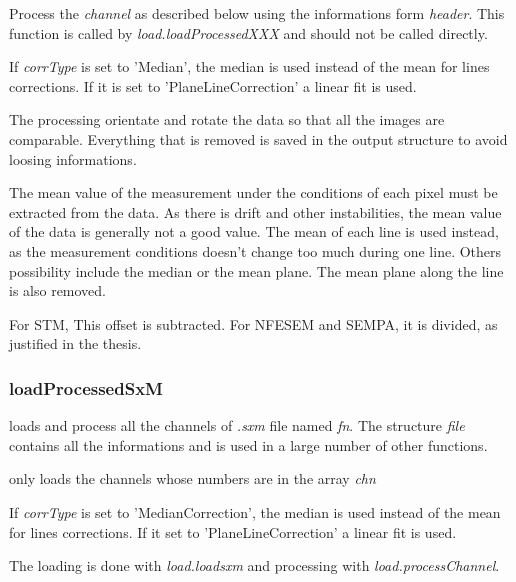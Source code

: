 \bdf
{} Process the \emph{channel} as described below using the informations form \emph{header}. This function is called by \emph{load.loadProcessedXXX} and should not be called directly.

 If \emph{corrType} is set to 'Median', the median is used instead of the mean for lines corrections. If it is set to 'PlaneLineCorrection' a linear fit is used.  
\edf

The processing orientate and rotate the data so that all the images are comparable.
Everything that is removed is saved in the output structure to avoid loosing informations.

The mean value of the measurement under the conditions of each pixel must be extracted from the data. As there is drift and other instabilities, the mean value of the data is generally not a good value. The mean of each line is used instead, as the measurement conditions doesn't change too much during one line. Others possibility include the median or the mean plane. The mean plane along the line is also removed.

For STM, This offset is subtracted. For NFESEM and SEMPA, it is divided, as justified in the thesis.
\subsubsection{loadProcessedSxM}
\bdf
{} loads and process all the channels of \emph{.sxm} file named \emph{fn}. The structure \emph{file} contains all the informations and is used in a large number of other functions.

 only loads the channels whose numbers are in the array \emph{chn}

 If \emph{corrType} is set to 'MedianCorrection', the median is used instead of the mean for lines corrections. If it set to 'PlaneLineCorrection' a linear fit is used. 

\edf

The loading is done with \emph{load.loadsxm} and processing with \emph{load.processChannel}.

%
%
%
%

